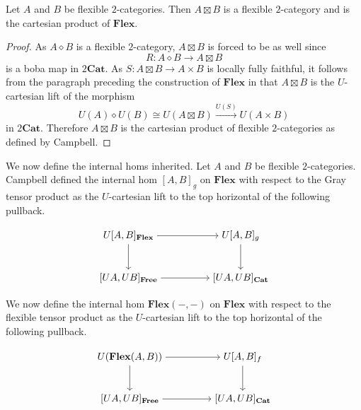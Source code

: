 \documentclass{tac}
\begin{document}
\begin{theorem}\label{restrict_of_flex_prod_is_cart_prod}
Let $A$ and $B$ be flexible $2$-categories. Then $A\boxtimes B$ is a flexible $2$-category and is the cartesian product of $\mathbf{Flex}$.
\end{theorem}

\begin{proof}
As $A\diamond B$ is a flexible $2$-category, $A\boxtimes B$ is forced to be as well since 
\[
R:A\diamond B\to A\boxtimes B
\]
is a boba map in $2\mathbf{Cat}$. As $S:A\boxtimes B\to A\times B$ is locally fully faithful, it follows from the paragraph preceding the construction of $\mathbf{Flex}$ in \cite{Campbell2026} that $A\boxtimes B$ is the $U$-cartesian lift of the morphism 
\[
U(A)\diamond U(B)\cong U(A\boxtimes B)\xrightarrow{U(S)} U(A\times B)
\]
in $2\mathbf{Cat}$. Therefore $A\boxtimes B$ is the cartesian product of flexible $2$-categories as defined by Campbell. 
\end{proof}

We now define the internal homs inherited. Let $A$ and $B$ be flexible $2$-categories. Campbell defined the internal hom $[A,B]_g$ on $\mathbf{Flex}$ with respect to the Gray tensor product as the $U$-cartesian lift to the top horizontal of the following pullback.

\begin{equation}
    \begin{tikzpicture}[baseline=(current bounding box.center)]
\node (TL) at (0,1.5)
{$U[A,B]_\mathbf{Flex}$};
\node (TR) at (4,1.5)
{$U[A,B]_{g}$};
\node (BL) at (0,0)
{$[UA,UB]_{\textbf{Free}}$};
\node (BR) at (4,0)
{$[UA,UB]_{\mathbf{Cat}}$};

\draw[->] (TL) to node[above]{} (TR);
\draw[->] (TL) to node[left]{} (BL);
\draw[->] (TR) to node[right]{} (BR);
\draw[->] (BL) to node[below]{} (BR);
\end{tikzpicture}
\end{equation}

We now define the internal hom $\mathbf{Flex}(-,-)$ on $\mathbf{Flex}$ with respect to the flexible tensor product as the $U$-cartesian lift to the top horizontal of the following pullback.

\begin{equation}
    \begin{tikzpicture}[baseline=(current bounding box.center)]
\node (TL) at (0,1.5){$U(\mathbf{Flex}(A,B))$};
\node (TR) at (4,1.5)
{$U[A,B]_{f}$};
\node (BL) at (0,0)
{$[UA,UB]_{\textbf{Free}}$};
\node (BR) at (4,0)
{$[UA,UB]_{\mathbf{Cat}}$};

\draw[->] (TL) to node[above]{} (TR);
\draw[->] (TL) to node[left]{} (BL);
\draw[->] (TR) to node[right]{} (BR);
\draw[->] (BL) to node[below]{} (BR);
\end{tikzpicture}
\end{equation}
\end{document}
